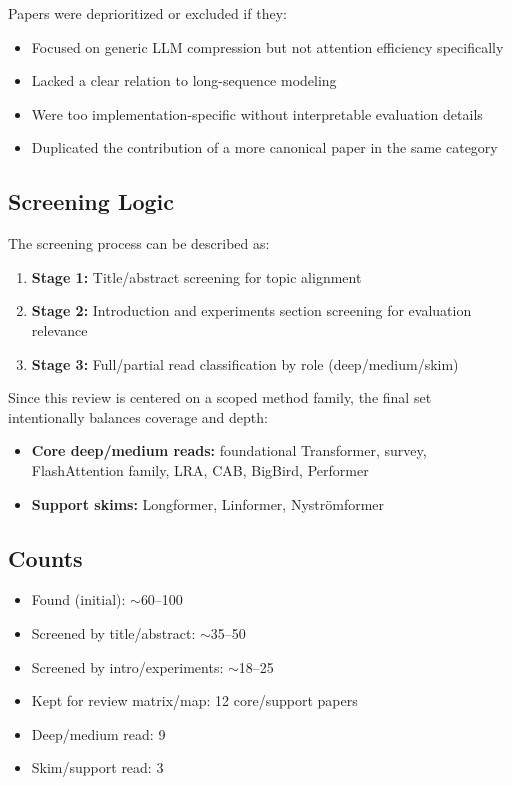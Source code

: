 \documentclass[12pt, a4paper]{article}
\begin{document}
Papers were deprioritized or excluded if they:
\begin{itemize}
    \item Focused on generic LLM compression but not attention efficiency specifically
    \item Lacked a clear relation to long-sequence modeling
    \item Were too implementation-specific without interpretable evaluation details
    \item Duplicated the contribution of a more canonical paper in the same category
\end{itemize}

\subsection{Screening Logic}

The screening process can be described as:
\begin{enumerate}
    \item \textbf{Stage 1:} Title/abstract screening for topic alignment
    \item \textbf{Stage 2:} Introduction and experiments section screening for evaluation relevance
    \item \textbf{Stage 3:} Full/partial read classification by role (deep/medium/skim)
\end{enumerate}

Since this review is centered on a scoped method family, the final set intentionally balances coverage and depth:
\begin{itemize}
    \item \textbf{Core deep/medium reads:} foundational Transformer, survey, FlashAttention family, LRA, CAB, BigBird, Performer
    \item \textbf{Support skims:} Longformer, Linformer, Nystr\"{o}mformer
\end{itemize}

\subsection{Counts}

\begin{itemize}
    \item Found (initial): $\sim$60--100
    \item Screened by title/abstract: $\sim$35--50
    \item Screened by intro/experiments: $\sim$18--25
    \item Kept for review matrix/map: 12 core/support papers
    \item Deep/medium read: 9
    \item Skim/support read: 3
\end{itemize}
\end{document}
